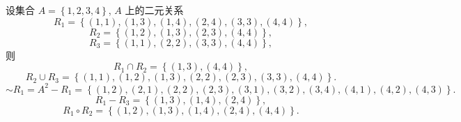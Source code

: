 \documentclass[10pt,UTF8]{book} %
\begin{document}
\begin{exercise}
    设集合 $A = \left\{ 1,2,3,4 \right\}$, $A$ 上的二元关系
    \[ R_1 = \left\{ (1,1), (1,3), (1,4), (2,4), (3,3), (4,4) \right\}, \]
    \[ R_2 = \left\{ (1,2), (1,3), (2,3), (4,4) \right\}, \]
    \[ R_3 = \left\{ (1,1), (2,2), (3,3), (4,4) \right\}, \]
    则 \[ R_1 \cap R_2 = \left\{
        (1,3), (4,4)
    \right\}, \] 
    \[ R_2 \cup R_3 = \left\{
        (1,1), (1,2), (1,3), (2,2), (2,3), (3,3), (4,4)
    \right\}. \] 
    \[ \sim R_1 = A^2 - R_1 = \left\{
        (1,2), (2,1), (2,2), (2,3),
        (3,1), (3,2), (3,4), (4,1), (4,2), (4,3)
    \right\}. \]
    \[ R_1 - R_3 = \left\{
        (1,3), (1,4), (2,4)
    \right\}, \]
    \[ R_1 \circ R_2 = \left\{
        (1,2), (1,3), (1,4),
        (2,4),
        (4,4)
    \right\}. \]
    \begin{figure}[H]
        \centering



        \begin{tikzpicture}[x=0.75pt,y=0.75pt,yscale=-1,xscale=1]
        

\end{tikzpicture}
\end{figure}
\end{exercise}
\end{document}
